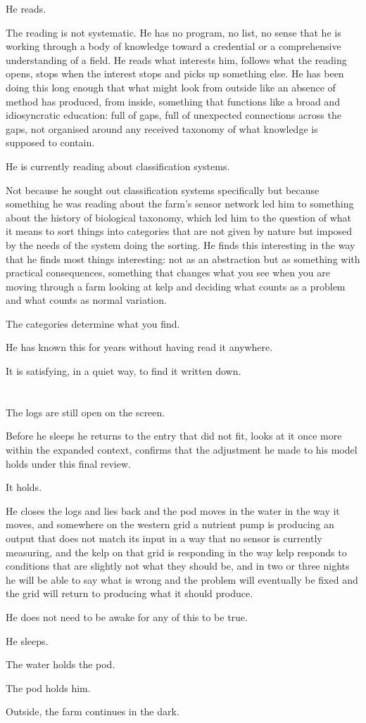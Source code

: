 He reads.

The reading is not systematic. He has no program,
no list, no sense that he is working through a
body of knowledge toward a credential or a
comprehensive understanding of a field. He
reads what interests him, follows what the
reading opens, stops when the interest stops
and picks up something else. He has been doing
this long enough that what might look from
outside like an absence of method has produced,
from inside, something that functions like a
broad and idiosyncratic education: full of
gaps, full of unexpected connections across
the gaps, not organised around any received
taxonomy of what knowledge is supposed to
contain.

He is currently reading about classification
systems.

Not because he sought out classification
systems specifically but because something
he was reading about the farm's sensor network
led him to something about the history of
biological taxonomy, which led him to the
question of what it means to sort things into
categories that are not given by nature but
imposed by the needs of the system doing the
sorting. He finds this interesting in the way
that he finds most things interesting: not as
an abstraction but as something with practical
consequences, something that changes what
you see when you are moving through a farm
looking at kelp and deciding what counts as
a problem and what counts as normal variation.

The categories determine what you find.

He has known this for years without having
read it anywhere.

It is satisfying, in a quiet way, to find it
written down.

\section{}

The logs are still open on the screen.

Before he sleeps he returns to the entry that
did not fit, looks at it once more within the
expanded context, confirms that the adjustment
he made to his model holds under this final
review.

It holds.

He closes the logs and lies back and the pod
moves in the water in the way it moves, and
somewhere on the western grid a nutrient
pump is producing an output that does not
match its input in a way that no sensor is
currently measuring, and the kelp on that
grid is responding in the way kelp responds
to conditions that are slightly not what
they should be, and in two or three nights
he will be able to say what is wrong and
the problem will eventually be fixed and
the grid will return to producing what it
should produce.

He does not need to be awake for any of this
to be true.

He sleeps.

The water holds the pod.

The pod holds him.

Outside, the farm continues in the dark.

